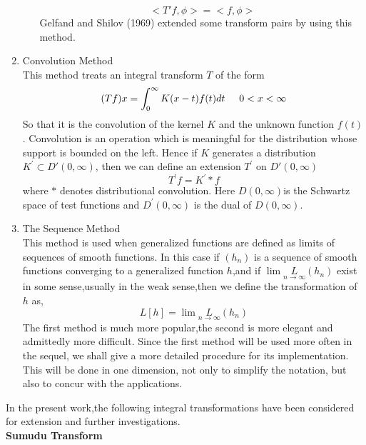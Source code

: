 \begin{large}
\begin{enumerate}
\begin{itemize}
\begin{equation}
<T'f,\phi> = <f,\phi>
\end{equation}
Gelfand and Shilov (1969) extended some transform pairs by using this method.
\end{itemize}
\item Convolution Method\\
This method treats an integral transform $T$ of the form\\
\begin{equation}
(Tf)x=\int_{0}^{\infty}K(x-t)f(t)dt \hspace{0.5cm} 0<x<\infty
\end{equation}
So that it is the convolution of the kernel $K$ and the unknown function $ f(t) $. Convolution is an operation which is meaningful for the distribution whose support is bounded on the left. Hence if $K$ generates a distribution $K^{\prime} \subset D'(0,\infty)$, then we can define an extension $T^{\prime}$ on $D'(0,\infty)$
\begin{equation}
T^{\prime}f=K^{\prime}\ast f
\end{equation}
where $ \ast $ denotes distributional convolution. Here $D(0,\infty)$is the Schwartz space of test functions and $D^{\prime}(0,\infty)$ is the dual of $D(0,\infty)$.
\item The Sequence Method\\   
This method is used when generalized functions are defined as limits of sequences of smooth functions. In this case if $(h_{n})$ is a sequence of smooth functions converging to a generalized function $h$,and if $\lim \underset{n\rightarrow \infty}L(h_{n})$ exist in some sense,usually in the weak sense,then we define the transformation of $h$ as,
\begin{equation}
L[h]=\lim \underset{n\rightarrow \infty}L(h_{n})
\end{equation}
The first method is much more popular,the second is more elegant and admittedly more difficult. Since the first method will be used more often in the sequel, we shall give a more detailed procedure for its implementation. This will be done in one dimension, not only to simplify the notation, but also to concur with the applications.
\end{enumerate}
In the present work,the following integral transformations have been considered for extension and further investigations.\\
\textbf{Sumudu Transform}\\

\end{large}

